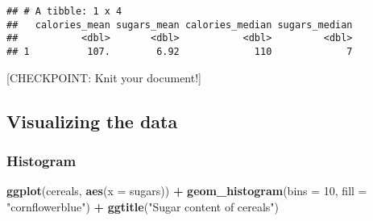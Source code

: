 \documentclass[]{article}
\newenvironment{Shaded}{\begin{snugshade}}{\end{snugshade}}
\newcommand{\DataTypeTok}[1]{\textcolor[rgb]{0.13,0.29,0.53}{#1}}
\newcommand{\DecValTok}[1]{\textcolor[rgb]{0.00,0.00,0.81}{#1}}
\newcommand{\KeywordTok}[1]{\textcolor[rgb]{0.13,0.29,0.53}{\textbf{#1}}}
\newcommand{\NormalTok}[1]{#1}
\newcommand{\OperatorTok}[1]{\textcolor[rgb]{0.81,0.36,0.00}{\textbf{#1}}}
\newcommand{\StringTok}[1]{\textcolor[rgb]{0.31,0.60,0.02}{#1}}
\begin{document}
\begin{Shaded}
\end{Shaded}

\begin{verbatim}
## # A tibble: 1 x 4
##   calories_mean sugars_mean calories_median sugars_median
##           <dbl>       <dbl>           <dbl>         <dbl>
## 1          107.        6.92             110             7
\end{verbatim}

\begin{Shaded}
\end{Shaded}

{[}CHECKPOINT: Knit your document!{]}

\hypertarget{visualizing-the-data}{%
\subsection{Visualizing the data}\label{visualizing-the-data}}

\hypertarget{histogram}{%
\subsubsection{Histogram}\label{histogram}}

\begin{Shaded}
\begin{Highlighting}[]
\KeywordTok{ggplot}\NormalTok{(cereals, }\KeywordTok{aes}\NormalTok{(}\DataTypeTok{x =}\NormalTok{ sugars)) }\OperatorTok{+}\StringTok{ }
\StringTok{  }\KeywordTok{geom_histogram}\NormalTok{(}\DataTypeTok{bins =} \DecValTok{10}\NormalTok{, }\DataTypeTok{fill =} \StringTok{"cornflowerblue"}\NormalTok{) }\OperatorTok{+}
\StringTok{  }\KeywordTok{ggtitle}\NormalTok{(}\StringTok{"Sugar content of cereals"}\NormalTok{)}
\end{Highlighting}
\end{Shaded}
\end{document}
